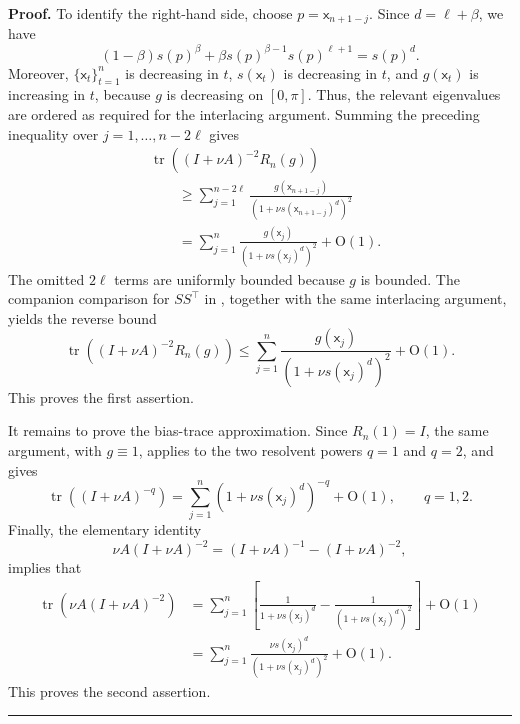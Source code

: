 \documentclass[11pt]{article}
\newcommand{\sfx}{\mathsf{x}}
\newenvironment{proof}[1][Proof]{\noindent\textbf{#1.} }{\ \rule{0.5em}{0.5em}}
\numberwithin{equation}{section}
\numberwithin{figure}{section}
\begin{document}
\begin{proof}
To identify the right-hand side, choose \(p=\sfx_{n+1-j}\). Since \(d=\ell+\beta\), we have
\begin{equation*}
(1-\beta)s(p)^\beta
+
\beta s(p)^{\beta-1}s(p)^{\ell+1}
=
s(p)^d.
\end{equation*}
Moreover, \(\{\sfx_t\}_{t=1}^n\) is decreasing in \(t\), \(s(\sfx_t)\) is decreasing in \(t\), and \(g(\sfx_t)\) is increasing in \(t\), because \(g\) is decreasing on \([0,\pi]\). Thus, the relevant eigenvalues are ordered as required for the interlacing argument. Summing the preceding inequality over \(j=1,\ldots,n-2\ell\) gives
\begin{align*}
&\operatorname{tr}\!\left(
(I+\nu A)^{-2}R_n(g)
\right) \\
&\qquad \geq
\sum_{j=1}^{n-2\ell}
\frac{g(\sfx_{n+1-j})}
{(1+\nu s(\sfx_{n+1-j})^d)^{2}} \\
&\qquad =
\sum_{j=1}^{n}
\frac{g(\sfx_j)}
{(1+\nu s(\sfx_j)^d)^{2}}
+
\mathrm{O}(1).
\end{align*}
The omitted \(2\ell\) terms are uniformly bounded because \(g\) is bounded. The companion comparison for \(SS^\top\) in \cite[Theorem~6(a) and Theorem~7(b), (d)]{BURMAN2006677}, together with the same interlacing argument, yields the reverse bound
\begin{equation*}
\operatorname{tr}\!\left(
(I+\nu A)^{-2}R_n(g)
\right)
\leq
\sum_{j=1}^{n}
\frac{g(\sfx_j)}
{(1+\nu s(\sfx_j)^d)^{2}}
+
\mathrm{O}(1).
\end{equation*}
This proves the first assertion.

It remains to prove the bias-trace approximation. Since \(R_n(1)=I\), the same argument, with \(g\equiv1\), applies to the two resolvent powers \(q=1\) and \(q=2\), and gives
\begin{equation*}
\operatorname{tr}\!\left(
(I+\nu A)^{-q}
\right)
=
\sum_{j=1}^{n}
(1+\nu s(\sfx_j)^d)^{-q}
+
\mathrm{O}(1),
\qquad
q=1,2.
\end{equation*}
Finally, the elementary identity
\begin{equation*}
\nu A(I+\nu A)^{-2}
=
(I+\nu A)^{-1}
-
(I+\nu A)^{-2},
\end{equation*}
implies that
\begin{align*}
\operatorname{tr}\!\left(
\nu A(I+\nu A)^{-2}
\right)
&=
\sum_{j=1}^{n}
\left[
\frac{1}{1+\nu s(\sfx_j)^d}
-
\frac{1}{(1+\nu s(\sfx_j)^d)^{2}}
\right]
+
\mathrm{O}(1) \\
&=
\sum_{j=1}^{n}
\frac{\nu s(\sfx_j)^d}
{(1+\nu s(\sfx_j)^d)^{2}}
+
\mathrm{O}(1).
\end{align*}
This proves the second assertion.
\end{proof}
\end{document}
